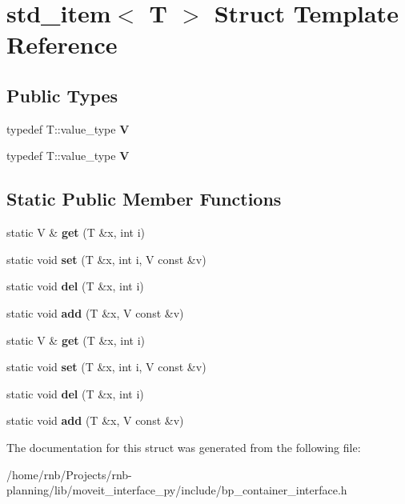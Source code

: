 \hypertarget{structstd__item}{}\section{std\+\_\+item$<$ T $>$ Struct Template Reference}
\label{structstd__item}
\subsection*{Public Types}
\begin{DoxyCompactItemize}
\item 
\mbox{\label{structstd__item_a978c5a033f4aba8658e24665dfe0536b}} 
typedef T\+::value\+\_\+type {\bfseries V}
\item 
\mbox{\label{structstd__item_a978c5a033f4aba8658e24665dfe0536b}} 
typedef T\+::value\+\_\+type {\bfseries V}
\end{DoxyCompactItemize}
\subsection*{Static Public Member Functions}
\begin{DoxyCompactItemize}
\item 
\mbox{\label{structstd__item_a21e077b289a3ff0499cf32752ebdc099}} 
static V \& {\bfseries get} (T \&x, int i)
\item 
\mbox{\label{structstd__item_a29cf4c955bf3361a3464da7d408446b9}} 
static void {\bfseries set} (T \&x, int i, V const \&v)
\item 
\mbox{\label{structstd__item_afffd0335edf3bfa82c47981ba5707a4c}} 
static void {\bfseries del} (T \&x, int i)
\item 
\mbox{\label{structstd__item_a4f8c0188ad4ecf94723d432509dbc334}} 
static void {\bfseries add} (T \&x, V const \&v)
\item 
\mbox{\label{structstd__item_a21e077b289a3ff0499cf32752ebdc099}} 
static V \& {\bfseries get} (T \&x, int i)
\item 
\mbox{\label{structstd__item_a29cf4c955bf3361a3464da7d408446b9}} 
static void {\bfseries set} (T \&x, int i, V const \&v)
\item 
\mbox{\label{structstd__item_afffd0335edf3bfa82c47981ba5707a4c}} 
static void {\bfseries del} (T \&x, int i)
\item 
\mbox{\label{structstd__item_a4f8c0188ad4ecf94723d432509dbc334}} 
static void {\bfseries add} (T \&x, V const \&v)
\end{DoxyCompactItemize}


The documentation for this struct was generated from the following file\+:\begin{DoxyCompactItemize}
\item 
/home/rnb/\+Projects/rnb-\/planning/lib/moveit\+\_\+interface\+\_\+py/include/bp\+\_\+container\+\_\+interface.\+h\end{DoxyCompactItemize}
